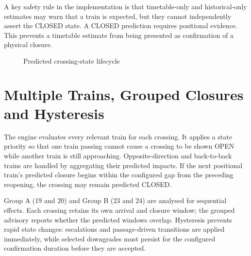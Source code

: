 \documentclass[11pt,a4paper]{report}
\begin{document}
A key safety rule in the implementation is that timetable-only and historical-only estimates may warn that a train is expected, but they cannot independently assert the CLOSED state. A CLOSED prediction requires positional evidence. This prevents a timetable estimate from being presented as confirmation of a physical closure.

\begin{figure}[H]\centering
{}
\caption{Predicted crossing-state lifecycle}
\label{fig:state}
\end{figure}

\section{Multiple Trains, Grouped Closures and Hysteresis}
The engine evaluates every relevant train for each crossing. It applies a state priority so that one train passing cannot cause a crossing to be shown OPEN while another train is still approaching. Opposite-direction and back-to-back trains are handled by aggregating their predicted impacts. If the next positional train's predicted closure begins within the configured gap from the preceding reopening, the crossing may remain predicted CLOSED.

Group A (19 and 20) and Group B (23 and 24) are analysed for sequential effects. Each crossing retains its own arrival and closure window; the grouped advisory reports whether the predicted windows overlap. Hysteresis prevents rapid state changes: escalations and passage-driven transitions are applied immediately, while selected downgrades must persist for the configured confirmation duration before they are accepted.
\end{document}
